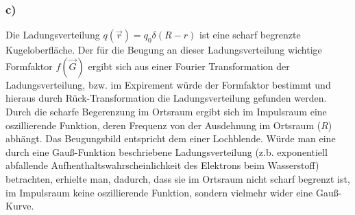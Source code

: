 \documentclass[11pt]{article}
\begin{document}
\subsubsection*{c)}
Die Ladungsverteilung $q(\vec{r}) = q_0\delta(R-r)$ ist eine scharf begrenzte Kugeloberfläche.
Der für die Beugung an dieser Ladungsverteilung wichtige Formfaktor $f(\vec{G})$ ergibt sich
aus einer Fourier Transformation der Ladungsverteilung,
bzw. im Expirement würde der Formfaktor bestimmt und hieraus durch Rück-Transformation
die Ladungsverteilung gefunden werden. Durch die scharfe Begerenzung im Ortsraum ergibt
sich im Impulsraum eine oszillierende Funktion, deren Frequenz von der Ausdehnung im Ortsraum ($R$) abhängt.
Das Beugungsbild entspricht dem einer Lochblende.
Würde man eine durch eine Gauß-Funktion beschriebene Ladungsverteilung (z.b. exponentiell abfallende
Aufhenthaltswahrscheinlichkeit des Elektrons beim Wasserstoff) betrachten, erhielte man,
dadurch, dass sie im Ortsraum nicht scharf begrenzt ist, im Impulsraum keine oszillierende
Funktion, sondern vielmehr wider eine Gauß-Kurve.
\end{document}
